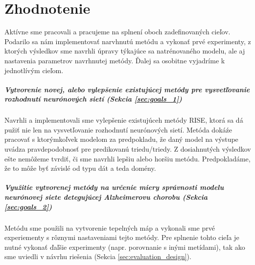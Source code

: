\chapter{Zhodnotenie}

Aktívne sme pracovali a pracujeme na splnení oboch zadefinovaných cieľov. Podarilo sa nám implementovať narvhnutú metódu a vykonať prvé experimenty, z ktorých výsledkov sme navrhli úpravy týkajúce sa natrénovaného modelu, ale aj nastavenia parametrov navrhnutej metódy. Ďalej sa osobitne vyjadríme k jednotlívým cieľom.

\paragraph{Vytvorenie novej, alebo vylepšenie existujúcej metódy pre vysvetľovanie rozhodnutí neurónových sietí (Sekcia \ref{sec:goals_1})}

Navrhli a implementovali sme vylepšenie existujúceh metódy RISE, ktorá sa dá pužiť nie len na vysvetľovanie rozhodnutí neurónových sietí. Metóda dokáźe pracovať s ktorýmkoľvek modelom za predpokladu, že daný model na výstupe uvádza pravdepodobnosť pre predikovanú triedu/triedy. Z dosiahnutých výsledkov ešte nemôžeme tvrdiť, či sme navrhli lepšiu alebo horšiu metódu. Predpokladáme, že to môže byť závislé od typu dát a teda domény.

\paragraph{Využitie vytvorenej metódy na určenie miery správnosti modelu neurónovej siete detegujúcej Alzheimerovu chorobu (Sekcia \ref{sec:goals_2})}

Metódu sme použili na vytvorenie tepelných máp a vykonali sme prvé experiementy s rôznymi nastaveniami tejto metódy. Pre splnenie tohto cieľa je nutné vykonať ďaľšie experimenty (napr. porovnanie s inými metídami), tak ako sme uviedli v návrhu riešenia (Sekcia \ref{sec:evaluation_design}).


